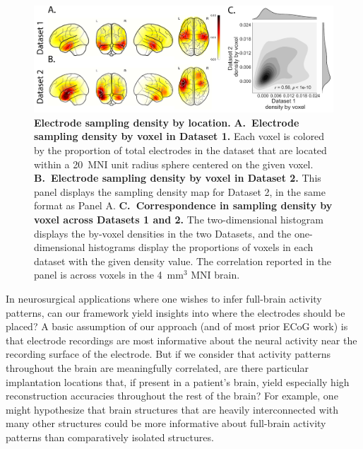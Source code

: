 \message{ !name(main.tex)}\documentclass[11pt]{article}
\begin{document}
{\begin{figure}
  \centering
  \includegraphics[width=\textwidth]{figs/density}
  \caption{\textbf{Electrode sampling density by location.}
    \textbf{A.~Electrode sampling density by voxel in Dataset 1.} Each
    voxel is colored by the proportion of total electrodes in the
    dataset that are
    located within a 20~MNI unit radius sphere centered on the given
    voxel.  \textbf{B.~Electrode sampling density by voxel in Dataset
      2.}  This panel displays the sampling density map for Dataset 2,
    in the same format as Panel A.  \textbf{C.~Correspondence in
      sampling density by voxel across Datasets 1 and 2.}  The
    two-dimensional histogram displays the by-voxel densities in the
    two Datasets, and the one-dimensional histograms display the
    proportions of voxels in each dataset with the given density
    value.  The correlation reported in the panel is across voxels in
    the 4~mm$^3$ MNI brain.}
  \label{fig:density}
\end{figure}

In neurosurgical applications where one wishes to infer full-brain
activity patterns, can our framework yield insights into where the
electrodes should be placed?  A basic assumption of our approach (and
of most prior ECoG work) is that electrode recordings are most
informative about the neural activity near the recording surface of
the electrode.  But if we consider that activity patterns throughout
the brain are meaningfully correlated, are there particular
implantation locations that, if present in a patient's brain, yield
especially high reconstruction accuracies throughout the rest of the
brain?  For example, one might hypothesize that brain structures that
are heavily interconnected with many other structures could be more
informative about full-brain activity patterns than comparatively
isolated structures.

}
\end{document}
